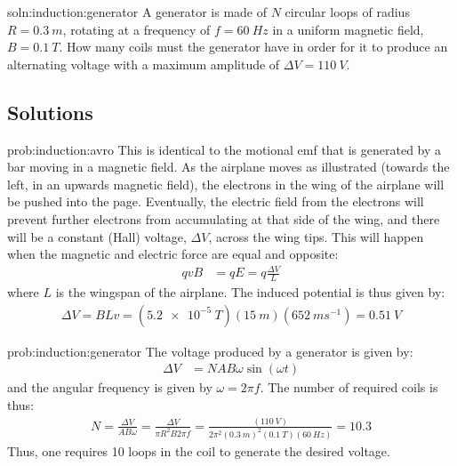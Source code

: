 \begin{problem}{soln:induction:generator}
{\label{prob:induction:generator} 
A generator is made of $N$ circular loops of radius $R=\SI{0.3}{m}$, rotating at a frequency of $f=\SI{60}{Hz}$ in a uniform magnetic field, $B=\SI{0.1}{T}$. How many coils must the generator have in order for it to produce an alternating voltage with a maximum amplitude of $\Delta V =\SI{110}{V}$.
}
\end{problem}

\newpage
\subsection{Solutions}
\begin{solution}{prob:induction:avro}\label{soln:induction:avro}
This is identical to the motional emf that is generated by a bar moving in a magnetic field. As the airplane moves as illustrated (towards the left, in an upwards magnetic field), the electrons in the wing of the airplane will be pushed into the page. Eventually, the electric field from the electrons will prevent further electrons from accumulating at that side of the wing, and there will be a constant (Hall) voltage, $\Delta V$, across the wing tips. This will happen when the magnetic and electric force are equal and opposite:
\begin{align*}
qvB &= qE = q\frac{\Delta V}{L}
\end{align*}
where $L$ is the wingspan of the airplane. The induced potential is thus given by:
\begin{align*}
\Delta V = BLv = (\SI{5.2e-5}{T})(\SI{15}{m})(\SI{652}{ms^{-1}})=\SI{0.51}{V}
\end{align*}
\end{solution}

\begin{solution}{prob:induction:generator}\label{soln:induction:generator}
The voltage produced by a generator is given by:
\begin{align*}
\Delta V&=NAB\omega\sin(\omega t)
\end{align*}
and the angular frequency is given by $\omega = 2\pi f$. The number of required coils is thus:
\begin{align*}
N=\frac{\Delta V}{AB\omega}=\frac{\Delta V}{\pi R^2B2\pi f}=\frac{(\SI{110}{V})}{2\pi^2(\SI{0.3}{m})^2(\SI{0.1}{T})(\SI{60}{Hz})}=10.3
\end{align*}
Thus, one requires 10 loops in the coil to generate the desired voltage. 

\end{solution}


